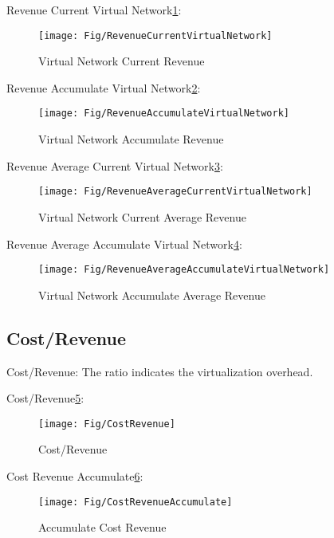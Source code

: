 Revenue Current Virtual Network\ref{fig:RevenueCurrentVirtualNetwork}:
\begin{figure}
  \centering
  \texttt{[image: Fig/RevenueCurrentVirtualNetwork]}\\
  \caption{Virtual Network Current Revenue }\label{fig:RevenueCurrentVirtualNetwork}
\end{figure}

Revenue Accumulate Virtual Network\ref{fig:RevenueAccumulateVirtualNetwork}:
\begin{figure}
  \centering
  \texttt{[image: Fig/RevenueAccumulateVirtualNetwork]}\\
  \caption{Virtual Network Accumulate Revenue }\label{fig:RevenueAccumulateVirtualNetwork}
\end{figure}

Revenue Average Current Virtual Network\ref{fig:RevenueAverageCurrentVirtualNetwork}:
\begin{figure}
  \centering
  \texttt{[image: Fig/RevenueAverageCurrentVirtualNetwork]}\\
  \caption{Virtual Network Current Average Revenue}\label{fig:RevenueAverageCurrentVirtualNetwork}
\end{figure}

Revenue Average Accumulate Virtual Network\ref{fig:RevenueAverageAccumulateVirtualNetwork}:
\begin{figure}
  \centering
  \texttt{[image: Fig/RevenueAverageAccumulateVirtualNetwork]}\\
  \caption{Virtual Network Accumulate Average Revenue}\label{fig:RevenueAverageAccumulateVirtualNetwork}
\end{figure}


\subsection{Cost/Revenue}
Cost/Revenue: The ratio indicates the virtualization overhead.

Cost/Revenue\ref{fig:CostRevenue}:
\begin{figure}
  \centering
  \texttt{[image: Fig/CostRevenue]}\\
  \caption{Cost/Revenue}\label{fig:CostRevenue}
\end{figure}

Cost Revenue Accumulate\ref{fig:CostRevenueAccumulate}:
\begin{figure}
  \centering
  \texttt{[image: Fig/CostRevenueAccumulate]}\\
  \caption{Accumulate Cost Revenue}\label{fig:CostRevenueAccumulate}
\end{figure}

